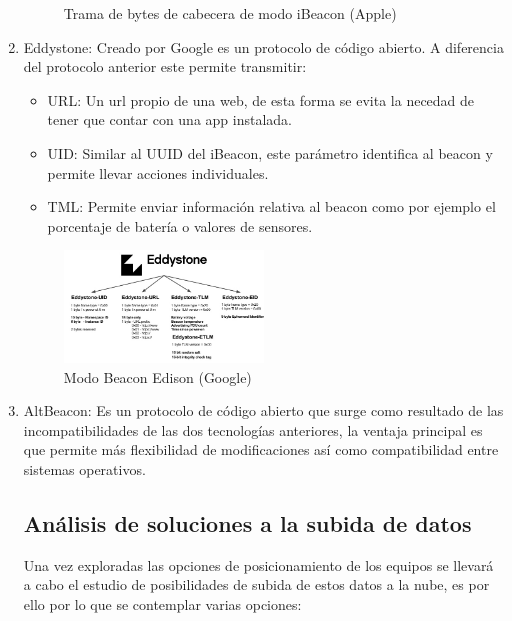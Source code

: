 \documentclass[a4paper ,12pt, onecolumn]{article}
\begin{document}
\begin{enumerate}
\begin{center}
\begin{figure}[ht]
                        \caption{Trama de bytes de cabecera de modo iBeacon (Apple)}
                        \label{fig:mesh2}
                    \end{figure}
                \end{center}
                \item Eddystone: Creado por Google es un protocolo de código abierto. A diferencia del protocolo anterior este 
                permite transmitir:
                \begin{itemize}
                    \item URL: Un url propio de una web, de esta forma se evita la necedad de tener que contar con una app instalada.
                    \item UID: Similar al UUID del iBeacon, este parámetro identifica al beacon y permite llevar acciones individuales.
                    \item TML: Permite enviar información relativa al beacon como por ejemplo el porcentaje de batería o valores de sensores.
                \end{itemize}
                \begin{center}
                    \begin{figure}[ht]
                        \centering
                        \includegraphics[width=0.5\textwidth]{tipos_beacon_edison.PNG}
                        \caption{Modo Beacon Edison (Google) }
                        \label{fig:mesh3}
                    \end{figure}
                \end{center}
                \item AltBeacon: Es un protocolo de código abierto que surge como resultado de las incompatibilidades de las dos 
                tecnologías anteriores, la ventaja principal es que permite más flexibilidad de modificaciones así como compatibilidad 
                entre sistemas operativos.
    \subsection{Análisis de soluciones a la subida de datos}
        Una vez exploradas las opciones de posicionamiento de los equipos se llevará a cabo el estudio de posibilidades de subida de estos datos
        a la nube, es por ello por lo que se contemplar varias opciones:

\end{enumerate}
\end{document}
